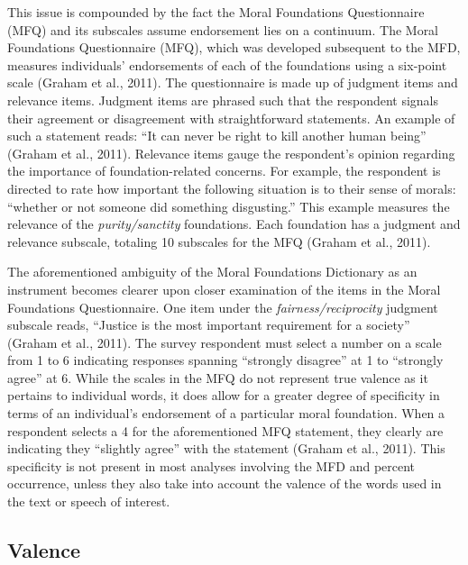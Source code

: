 \documentclass[,man]{apa6}
\begin{document}
This issue is compounded by the fact the Moral Foundations Questionnaire (MFQ) and its subscales assume endorsement lies on a continuum. The Moral Foundations Questionnaire (MFQ), which was developed subsequent to the MFD, measures individuals' endorsements of each of the foundations using a six-point scale (Graham et al., 2011). The questionnaire is made up of judgment items and relevance items. Judgment items are phrased such that the respondent signals their agreement or disagreement with straightforward statements. An example of such a statement reads: \enquote{It can never be right to kill another human being} (Graham et al., 2011). Relevance items gauge the respondent's opinion regarding the importance of foundation-related concerns. For example, the respondent is directed to rate how important the following situation is to their sense of morals: \enquote{whether or not someone did something disgusting.} This example measures the relevance of the \emph{purity/sanctity} foundations. Each foundation has a judgment and relevance subscale, totaling 10 subscales for the MFQ (Graham et al., 2011).

The aforementioned ambiguity of the Moral Foundations Dictionary as an instrument becomes clearer upon closer examination of the items in the Moral Foundations Questionnaire. One item under the \emph{fairness/reciprocity} judgment subscale reads, \enquote{Justice is the most important requirement for a society} (Graham et al., 2011). The survey respondent must select a number on a scale from 1 to 6 indicating responses spanning \enquote{strongly disagree} at 1 to \enquote{strongly agree} at 6. While the scales in the MFQ do not represent true valence as it pertains to individual words, it does allow for a greater degree of specificity in terms of an individual's endorsement of a particular moral foundation. When a respondent selects a 4 for the aforementioned MFQ statement, they clearly are indicating they \enquote{slightly agree} with the statement (Graham et al., 2011). This specificity is not present in most analyses involving the MFD and percent occurrence, unless they also take into account the valence of the words used in the text or speech of interest.

\hypertarget{valence}{%
\subsection{Valence}\label{valence}}
\end{document}
